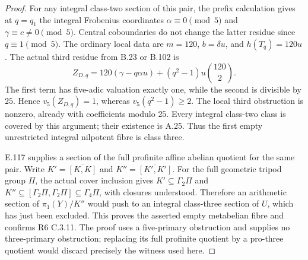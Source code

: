 \begin{proof}
For any integral class-two section of this pair, the prefix
calculation gives at $q=q_1$ the integral Frobenius coordinates
$\alpha\equiv0\pmod5$ and $\gamma\equiv c\ne0\pmod5$.
Central coboundaries do not change the latter residue since
$q\equiv1\pmod5$. The ordinary local data are
$m=120$, $b=\delta u$, and $h(T_q)=120u$.
The actual third residue from B.23 or B.102 is
\[
 Z_{D,q}=120(\gamma-q\alpha u)
          +(q^2-1)u\binom{120}{2}.
\]
The first term has five-adic valuation exactly one, while the
second is divisible by $25$. Hence $v_5(Z_{D,q})=1$, whereas
$v_5(q^2-1)\ge2$. The local third obstruction is nonzero, already
with coefficients modulo $25$. Every integral class-two class is
covered by this argument; their existence is A.25. Thus the first
empty unrestricted integral nilpotent fibre is class three.

E.117 supplies a section of the full profinite affine abelian
quotient for the same pair. Write $K'=\overline{[K,K]}$ and
$K''=\overline{[K',K']}$. For the full geometric tripod group
$\Pi$, the actual cover inclusion gives
$K'\subseteq\Gamma_2\Pi$ and
$K''\subseteq[\Gamma_2\Pi,\Gamma_2\Pi]\subseteq\Gamma_4\Pi$,
with closures understood. Therefore an arithmetic section of
$\pi_1(Y)/K''$ would push to an integral class-three section of
$U$, which has just been excluded. This proves the asserted empty
metabelian fibre and confirms R6 C.3.11. The proof uses a
five-primary obstruction and supplies no three-primary obstruction;
replacing its full profinite quotient by a pro-three quotient would
discard precisely the witness used here.
\end{proof}

